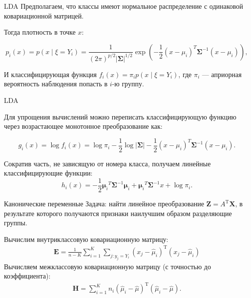 \documentclass[11pt]{beamer}
\begin{document}
\begin{frame}{LDA}
	Предполагаем, что классы имеют нормальное распределение с одинаковой ковариационной матрицей. 
	
	Тогда плотность в точке $x$:
	
	$$p_i(x) = p\left(x\middle\vert \xi = Y_i\right) = \frac{1}{\left(2\pi\right)^{p/2}\left\vert\bm{\Sigma}\right\vert^{1/2}} \exp\left(-\frac{1}{2}{\left(x -\mu_i\right)^T}\bm{\Sigma}^{-1}\left(x -\mu_i\right)\right),$$
	
	\pause
	И классифицирующая функция $f_i\left(x\right) = \pi_i p\left(x\middle\vert \xi = Y_i\right)$, где $\pi_i$ --- априорная вероятность наблюдения попасть в $i$-ю группу. 
\end{frame}

\begin{frame}{LDA}
	
	Для упрощения вычислений можно переписать классифицирующую функцию через возрастающее монотонное преобразование как:
	
	$$g_i\left(x\right) = \log f_i\left(x\right) = \log \pi_i - \frac{1}{2}\log\left\vert\bm{\Sigma}\right\vert -  \frac{1}{2}{\left(x -\mu_i\right)^T}\bm{\Sigma}^{-1}\left(x -\mu_i\right).$$
	
	\pause
	
	Сократив часть, не зависящую от номера класса, получаем линейные классифицирующие функции:
	$$h_i(x) = -\frac{1}{2}{\bm{\mu}_i}^T\bm{\Sigma}^{-1}\bm{\mu}_i + {\bm{\mu}_i}^T\bm{\Sigma}^{-1}x + \log\pi_i.$$
	
\end{frame}

\begin{frame}{Канонические переменные}
	Задача: найти линейное преобразование $\mathbf{Z} = A^\mathrm{T}\mathbf X$, в результате которого получаются признаки наилучшим образом разделяющие группы. 
	
	\pause
	
	Вычислим внутриклассовую ковариационную матрицу:
	\begin{align*}
		\mathbf{E} = \frac{1}{n - K} \sum\limits_{i = 1}^K \sum_{j: y_j = Y_i} (x_j - \widehat{\mu}_i)^\mathrm{T}(x_j - \widehat{\mu}_i)
	\end{align*}
	Вычисляем межклассовую ковариационную матрицу (с точностью до коэффициента):
	\begin{align*}
		\mathbf{H} = \sum\limits_{i = 1}^K n_i (\widehat{\mu}_i - \widehat{\mu})^\mathrm{T}(\widehat{\mu}_i - \widehat{\mu}).
	\end{align*}
	
\end{frame}
\end{document}
